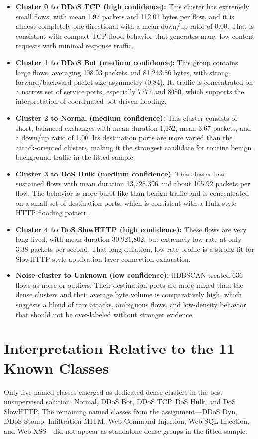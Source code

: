 \documentclass[journal,onecolumn]{IEEEtran}
\begin{document}
\begin{itemize}
\item \textbf{Cluster 0 to DDoS TCP (high confidence):} This cluster has extremely small flows, with mean 1.97 packets and 112.01 bytes per flow, and it is almost completely one directional with a mean down/up ratio of 0.00. That is consistent with compact TCP flood behavior that generates many low-content requests with minimal response traffic.
\item \textbf{Cluster 1 to DDoS Bot (medium confidence):} This group contains large flows, averaging 108.93 packets and 81,243.86 bytes, with strong forward/backward packet-size asymmetry (0.84). Its traffic is concentrated on a narrow set of service ports, especially 7777 and 8080, which supports the interpretation of coordinated bot-driven flooding.
\item \textbf{Cluster 2 to Normal (medium confidence):} This cluster consists of short, balanced exchanges with mean duration 1,152, mean 3.67 packets, and a down/up ratio of 1.00. Its destination ports are more varied than the attack-oriented clusters, making it the strongest candidate for routine benign background traffic in the fitted sample.
\item \textbf{Cluster 3 to DoS Hulk (medium confidence):} This cluster has sustained flows with mean duration 13,728,396 and about 105.92 packets per flow. The behavior is more burst-like than benign traffic and is concentrated on a small set of destination ports, which is consistent with a Hulk-style HTTP flooding pattern.
\item \textbf{Cluster 4 to DoS SlowHTTP (high confidence):} These flows are very long lived, with mean duration 30,921,802, but extremely low rate at only 3.38 packets per second. That long-duration, low-rate profile is a strong fit for SlowHTTP-style application-layer connection exhaustion.
\item \textbf{Noise cluster to Unknown (low confidence):} HDBSCAN treated 636 flows as noise or outliers. Their destination ports are more mixed than the dense clusters and their average byte volume is comparatively high, which suggests a blend of rare attacks, ambiguous flows, and low-density behavior that should not be over-labeled without stronger evidence.
\end{itemize}

\section{Interpretation Relative to the 11 Known Classes}
Only five named classes emerged as dedicated dense clusters in the best unsupervised solution: Normal, DDoS Bot, DDoS TCP, DoS Hulk, and DoS SlowHTTP. The remaining named classes from the assignment---DDoS Dyn, DDoS Stomp, Infiltration MITM, Web Command Injection, Web SQL Injection, and Web XSS---did not appear as standalone dense groups in the fitted sample.
\end{document}

